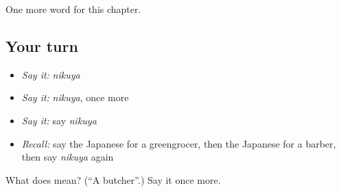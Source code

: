 \begin{grammarlens}[title={What you've built}]
One more word for this chapter.
\end{grammarlens}

\subsection*{Your turn}
\begin{itemize}
\raggedright
  \item \emph{Say it:} \emph{nikuya}
  \item \emph{Say it:} \emph{nikuya}, once more
  \item \emph{Say it:} say \emph{nikuya}
  \item \emph{Recall:} say the Japanese for a greengrocer, then the Japanese for a barber, then say \emph{nikuya} again
\end{itemize}

\begin{tcolorbox}[breakable,colback=teal!4,colframe=teal!35!black,title={Before you move on}]
What does  mean? (\textquotedblleft{}A butcher\textquotedblright{}.) Say it once more.
\end{tcolorbox}

